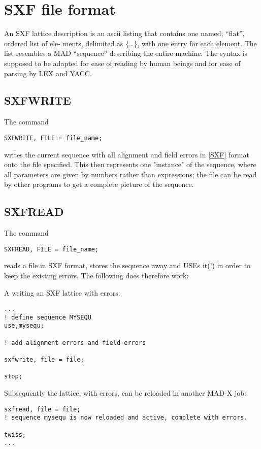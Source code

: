 
\chapter{SXF file format}

An SXF lattice description is an ascii listing that contains one named,
``flat'', ordered list of ele- ments, delimited as \{\ldots\}, with one
entry for each element. The list resembles a MAD ``sequence'' describing
the entire machine. The syntax is supposed to be adapted for ease of
reading by human beings and for ease of parsing by LEX and YACC. 

\section{SXFWRITE}

The command 
\begin{verbatim}
SXFWRITE, FILE = file_name;
\end{verbatim} 
writes the current  sequence with all alignment and
field errors in \href{../Introduction/bibliography.html#SXF}{[SXF]}
format onto the file specified. This then represents one "instance" of
the sequence, where all parameters are given by numbers rather than
expressions; the file can be read by other programs to get a complete
picture of the sequence.  

\section{SXFREAD}

The command 
\begin{verbatim}
SXFREAD, FILE = file_name;
\end{verbatim} 
reads a file in SXF format, stores the sequence away and USEs it(!) in
order to keep the existing errors. The following does therefore work:

A writing an SXF lattice with errors:
\begin{verbatim}
...
! define sequence MYSEQU
use,mysequ;

! add alignment errors and field errors

sxfwrite, file = file;

stop;
\end{verbatim}

Subsequently the lattice, with errors, can be reloaded in another MAD-X job:

\begin{verbatim}
sxfread, file = file;
! sequence mysequ is now reloaded and active, complete with errors.

twiss;
...
\end{verbatim}


